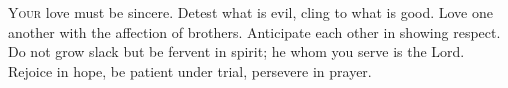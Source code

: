 
\lettrine{Y}{our} love must be sincere. Detest what is evil, cling to what is good. Love one another with the affection of brothers. Anticipate each other in showing respect. Do not grow slack but be fervent in spirit; he whom you serve is the Lord. Rejoice in hope, be patient under trial, persevere in prayer.